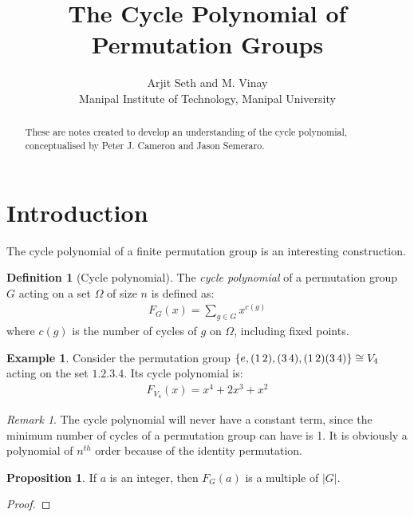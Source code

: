 \documentclass{article}
\theoremstyle{definition}
\newtheorem{Definition}{Definition}
\newtheorem*{Example*}{Example}
\newtheorem{Proposition}{Proposition}
\theoremstyle{remark}
\newtheorem*{Remark*}{Remark}
\theoremstyle{underline}
\theoremstyle{underline}
\begin{document}
\title{\textbf{The Cycle Polynomial of Permutation Groups}}

\author{\small Arjit Seth and M. Vinay \\ \small Manipal Institute of Technology, Manipal University}
\date{}
\maketitle

\renewcommand{\abstractname}{Context}
\begin{abstract}
These are notes created to develop an understanding of the cycle polynomial, conceptualised by Peter J. Cameron and Jason Semeraro.
\end{abstract}

\begingroup
\let\clearpage\relax
\tableofcontents
\endgroup

\medskip
\medskip

\section{Introduction}\label{sec:Intro}
The cycle polynomial of a finite permutation group is an interesting construction.

\begin{Definition}[Cycle polynomial]\label{def:CycPol}
The \emph{cycle polynomial} of a permutation group $G$ acting on a set $\Omega$ of size $n$ is defined as:
\begin{gather*}
	F_{G}(x) = \sum_{g \in G} x^{c(g)}
\end{gather*}
where $c(g)$ is the number of cycles of $g$ on $\Omega$, including fixed points.
\end{Definition}

\begin{Example*}
Consider the permutation group $\qty{e, (1 \, 2), (3 \, 4), (1 \, 2)(3 \, 4)} \cong V_4$ acting on the set $\qty{1, 2, 3, 4}$. Its cycle polynomial is:
\begin{gather}
	F_{V_4}(x) = x^4 + 2x^3 + x^2 
\end{gather}
\end{Example*}

\begin{Remark*}
The cycle polynomial will never have a constant term, since the minimum number of cycles of a permutation group can have is 1. It is obviously a polynomial of $n^{th}$ order because of the identity permutation.  
\end{Remark*}

\begin{Proposition}
If $a$ is an integer, then $F_G(a)$ is a multiple of $|G|$.
\end{Proposition}

\begin{proof}

\end{proof}
\end{document}
